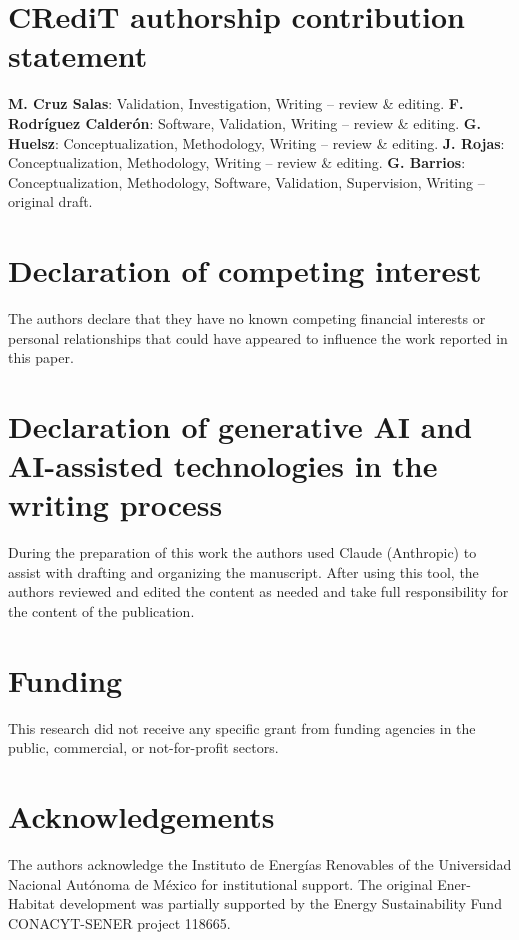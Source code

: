 \documentclass[preprint,12pt, a4paper]{elsarticle}
\begin{document}
\section*{CRediT authorship contribution statement}

\textbf{M. Cruz Salas}: Validation, Investigation, Writing -- review \& editing.
\textbf{F. Rodr\'iguez Calder\'on}: Software, Validation, Writing -- review \& editing.
\textbf{G. Huelsz}: Conceptualization, Methodology, Writing -- review \& editing.
\textbf{J. Rojas}: Conceptualization, Methodology, Writing -- review \& editing.
\textbf{G. Barrios}: Conceptualization, Methodology, Software, Validation, Supervision, Writing -- original draft.


\section*{Declaration of competing interest}

The authors declare that they have no known competing financial interests or personal relationships that could have appeared to influence the work reported in this paper.


\section*{Declaration of generative AI and AI-assisted technologies in the writing process}

During the preparation of this work the authors used Claude (Anthropic) to assist with drafting and organizing the manuscript. After using this tool, the authors reviewed and edited the content as needed and take full responsibility for the content of the publication.


\section*{Funding}

This research did not receive any specific grant from funding agencies in the public, commercial, or not-for-profit sectors.

\section*{Acknowledgements}

The authors acknowledge the Instituto de Energ\'ias Renovables of the Universidad Nacional Aut\'onoma de M\'exico for institutional support. The original Ener-Habitat development was partially supported by the Energy Sustainability Fund CONACYT-SENER project 118665.
\end{document}
